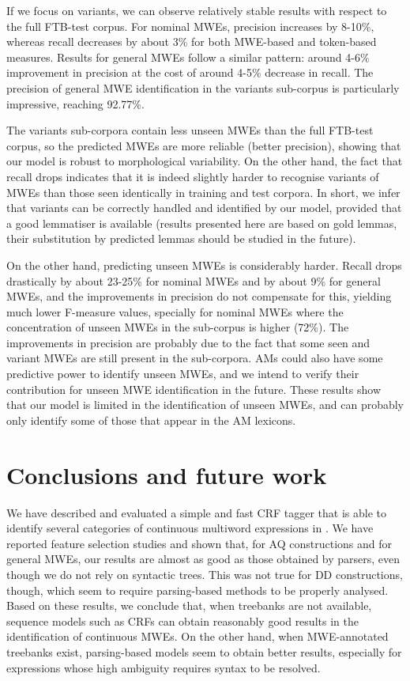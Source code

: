 \documentclass[output=paper,
modfonts
]{langscibook}
\begin{document}
If we focus on variants, we can observe relatively stable results with respect to the full FTB-test corpus. For nominal MWEs, precision increases by 8-10\%, whereas recall decreases by about 3\% for both MWE-based and token-based measures. Results for general MWEs follow a similar pattern: around 4-6\% improvement in precision at the cost of around 4-5\% decrease in recall. The precision of general MWE identification in the variants sub-corpus is particularly impressive, reaching 92.77\%.

The variants sub-corpora contain less unseen MWEs than the full FTB-test corpus, so the predicted MWEs are more reliable (better precision), showing that our model is robust to morphological variability. On the other hand, the fact that recall drops indicates that it is indeed slightly harder to recognise variants of MWEs than those seen identically in training and test corpora. In short, we infer that variants can be correctly handled and identified by our model, provided that a good lemmatiser is available (results presented here are based on gold lemmas, their substitution by predicted lemmas should be studied in the future).

On the other hand, predicting unseen MWEs is considerably harder. Recall drops drastically by about 23-25\% for nominal MWEs and by about 9\% for general MWEs, and the improvements in precision do not compensate for this, yielding much lower F-measure values, specially for nominal MWEs where the concentration of unseen MWEs in the sub-corpus is higher (72\%). The improvements in precision are probably due to the fact that some seen and variant MWEs are still present in the sub-corpora. AMs could also have some predictive power to identify unseen MWEs, and we intend to verify their contribution for unseen MWE identification in the future. These results show that our model is limited in the identification of unseen MWEs, and can probably only identify some of those that appear in the AM lexicons.


\section{Conclusions and future work}
\label{schol:sec:concl}

We have described and evaluated a simple and fast CRF tagger that is able to identify several categories of continuous multiword expressions in . We have reported feature selection studies and shown that, for AQ constructions and for general MWEs, our results are almost as good as those obtained by parsers, even though we do not rely on syntactic trees. This was not true for DD constructions, though, which seem to require parsing-based methods to be properly analysed. Based on these results, we conclude that, when treebanks are not available, sequence models such as CRFs can obtain reasonably good results in the identification of continuous MWEs. On the other hand, when MWE-annotated treebanks exist, parsing-based models seem to obtain better results, especially for expressions whose high ambiguity requires syntax to be resolved.
\end{document}
